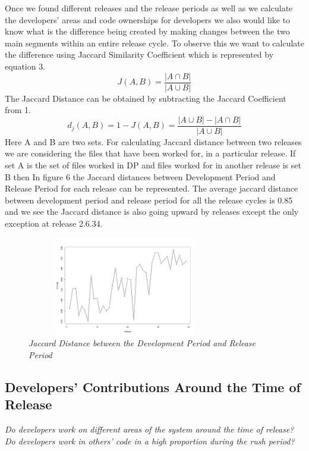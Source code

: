 \documentclass{acm_proc_article-sp}
\begin{document}
Once we found different releases and the release periods as well as we calculate the developers' areas and code ownerships for developers we also would like to know what is the difference being created by making changes between the two main segments within an entire release cycle. To observe this we want to calculate the difference using Jaccard Similarity Coefficient \cite{jaccard_alpine} which is represented by equation 3.
\begin{equation} J(A, B) =\frac{|A \cap B|}{|A \cup B|} \end{equation}
The Jaccard Distance can be obtained by subtracting the Jaccard Coefficient from 1.
\begin{equation} d_j(A, B) = 1 - J(A, B) = \frac{|A \cup B|-|A \cap B|}{|A \cup B|} \end{equation}
Here A and B are two sets. For calculating Jaccard distance between two releases we are considering the files that have been worked for, in a particular release. If set A is the set of files worked in DP and files worked for in another release is set B then In figure 6 the Jaccard distances between Development Period and Release Period for each release can be represented. The average jaccard distance between development period and release period for all the release cycles is 0.85 and we see the Jaccard distance is also going upward by releases except the only exception at release 2.6.34.

\begin{figure}
\begin{center}
\includegraphics[height=1.7in,width=3.4in]{jdMPRP.png}
\caption{\small \sl Jaccard Distance between the Development Period and Release Period}
\end{center}
\end{figure}

\subsection{Developers' Contributions Around the Time of Release}
\textit{Do developers work on different areas of the system around the time of release?}\newline
\textit{Do developers work in others' code in a high proportion during the rush period?}
\end{document}
